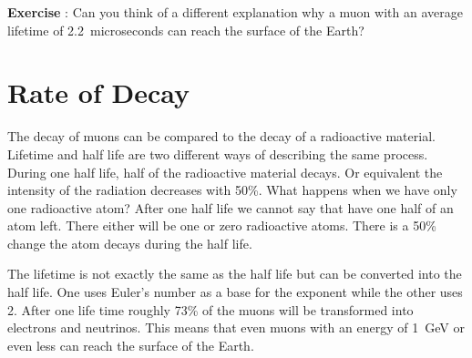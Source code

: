 \begin{shaded}
\textbf{Exercise \theExercise {}} : Can you think of a different explanation why a muon with an average lifetime of 2.2~microseconds can reach the surface of the Earth?\end{shaded}

\section{Rate of Decay}
The decay of muons can be compared to the decay of a radioactive material. Lifetime and half life are two different ways of describing the same process. During one half life, half of the radioactive material decays. Or equivalent the intensity of the radiation decreases with 50\%. What happens when we have only one radioactive atom? After one half life we cannot say that have one half of an atom left. There either will be one or zero radioactive atoms. There is a 50\% change the atom decays during the half life.

The lifetime is not exactly the same as the half life but can be converted into the half life. One uses Euler's number as a base for the exponent while the other uses 2. After one life time roughly 73\% of the muons will be transformed into electrons and neutrinos. This means that even muons with an energy of 1~GeV or even less can reach the surface of the Earth.



